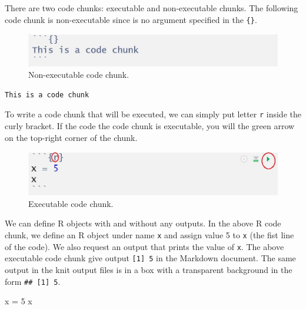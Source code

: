 \documentclass[
]{article}
\newenvironment{Shaded}{\begin{snugshade}}{\end{snugshade}}
\newcommand{\DecValTok}[1]{\textcolor[rgb]{0.00,0.00,0.81}{#1}}
\newcommand{\NormalTok}[1]{#1}
\newcommand{\OtherTok}[1]{\textcolor[rgb]{0.56,0.35,0.01}{#1}}
\begin{document}
There are two code chunks: executable and non-executable chunks. The
following code chunk is non-executable since is no argument specified in
the \texttt{\{\}}.

\begin{figure}

{\centering \includegraphics[width=12.14in]{img/Non-executable-code-chunk} 

}

\caption{Non-executable code chunk.}\label{fig:unnamed-chunk-3}
\end{figure}

\begin{verbatim}
This is a code chunk
\end{verbatim}

To write a code chunk that will be executed, we can simply put letter
\texttt{r} inside the curly bracket. If the code the code chunk is
executable, you will the green arrow on the top-right corner of the
chunk.

\begin{figure}

{\centering \includegraphics[width=9.39in]{img/Executable-code-chunk} 

}

\caption{Executable code chunk.}\label{fig:unnamed-chunk-4}
\end{figure}

We can define R objects with and without any outputs. In the above R
code chunk, we define an R object under name \texttt{x} and assign value
5 to \texttt{x} (the fist line of the code). We also request an output
that prints the value of \texttt{x}. The above executable code chunk
give output \texttt{{[}1{]}\ 5} in the Markdown document. The same
output in the knit output files is in a box with a transparent
background in the form \texttt{\#\#\ {[}1{]}\ 5}.

\begin{Shaded}
\begin{Highlighting}[]
\NormalTok{x }\OtherTok{=} \DecValTok{5}
\NormalTok{x}
\end{Highlighting}
\end{Shaded}
\end{document}
